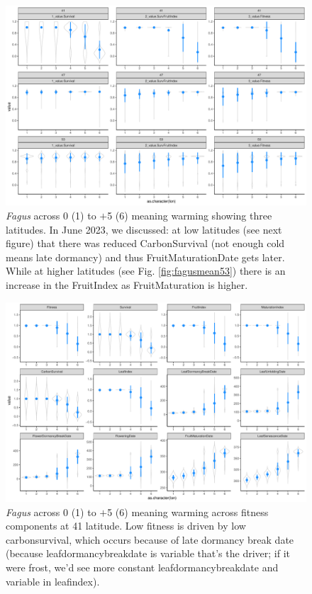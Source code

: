 \documentclass[11pt,letter]{article}
\begin{document}
\begin{figure} 
 \begin{center}
\noindent \includegraphics[width=1\textwidth]{..//analyses/graphs/phenofit/sims/metrics3/meansim_3metricsFS.pdf}
  \caption{\emph{Fagus} across 0 (1) to $+$5 (6) meaning warming showing three latitudes. In June 2023, we discussed: at low latitudes (see next figure) that there was reduced CarbonSurvival (not enough cold means late dormancy) and thus FruitMaturationDate gets later. While at higher latitudes (see Fig. \ref{fig:fagusmean53}) there is an increase in the FruitIndex as FruitMaturation is higher.}
  \label{fig:fagusmean3}
  \end{center}
\end{figure}

\begin{figure} 
 \begin{center}
\noindent \includegraphics[width=1\textwidth]{..//analyses/graphs/phenofit/sims/meansim41_allmetricsFS.pdf}
  \caption{\emph{Fagus} across 0 (1) to $+$5 (6) meaning warming across fitness components at 41 latitude. Low fitness is driven by low carbonsurvival, which occurs because of late dormancy break date (because leafdormancybreakdate is variable that's the driver; if it were frost, we'd see more constant leafdormancybreakdate and variable in leafindex).}
  \label{fig:fagusmean41}
  \end{center}
\end{figure}
\end{document}
